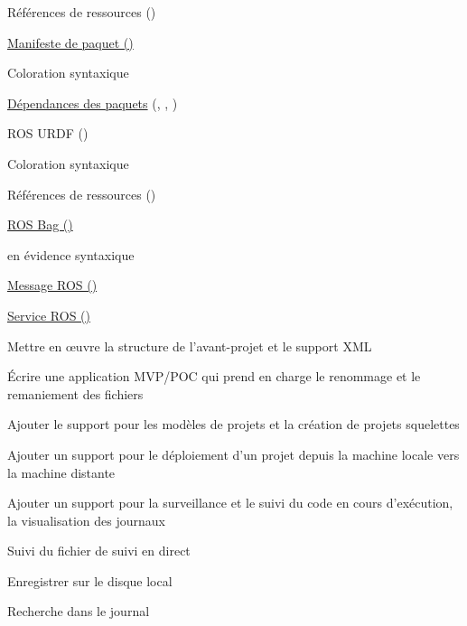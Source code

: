 {\begin{multicols}{2}
\begin{todolist}
\begin{todolist}
\item[\done] Références de ressources ()
\end{todolist}
\item[\done] \href{https://wiki.ros.org/Manifest}{Manifeste de paquet ()}
\begin{todolist}
\item[\done] Coloration syntaxique
\item[\done] \href{https://wiki.ros.org/catkin/package.xml#Dependencies}{Dépendances des paquets} (, , )
\end{todolist}
\item[\done] ROS URDF ()
\begin{todolist}
\item[\done] Coloration syntaxique
\item[\done] Références de ressources ()
\end{todolist}
\item[\done] \href{https://wiki.ros.org/Bags/Format}{ROS Bag ()}
\begin{todolist}
\Mise en évidence syntaxique
\end{todolist}
\item[\done] \href{https://wiki.ros.org/msg}{Message ROS ()}
\item[\done] \href{https://wiki.ros.org/srv}{Service ROS ()}
\item[\done] Mettre en œuvre la structure de l'avant-projet et le support XML
\item[\done] Écrire une application MVP/POC qui prend en charge le renommage et le remaniement des fichiers
\item[\done] Ajouter le support pour les modèles de projets et la création de projets squelettes
\item[\done] Ajouter un support pour le déploiement d'un projet depuis la machine locale vers la machine distante
\item[\done]Ajouter un support pour la surveillance et le suivi du code en cours d'exécution, la visualisation des journaux
\begin{todolist}
\item Suivi du fichier de suivi en direct
\item Enregistrer sur le disque local
\item Recherche dans le journal
\end{todolist}

\end{todolist}
\end{multicols}}
